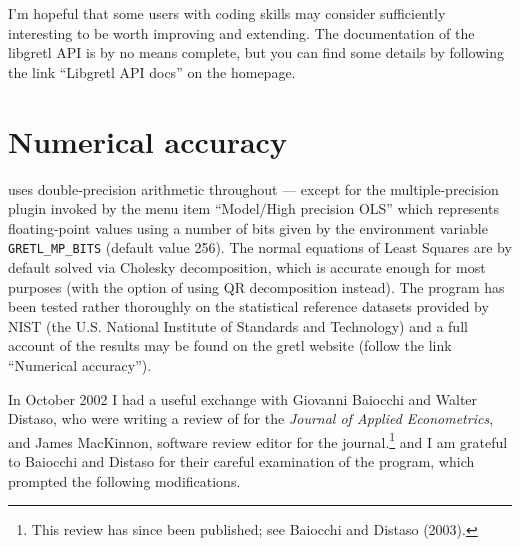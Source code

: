 I'm hopeful that some users with coding skills may consider
 sufficiently interesting to be worth improving and
extending.  The documentation of the libgretl API is by no means
complete, but you can find some details by following the link
``Libgretl API docs'' on the  homepage.

\chapter{Numerical accuracy}
\label{app-accuracy}

 uses double-precision arithmetic throughout --- except for
the multiple-precision plugin invoked by the menu item ``Model/High
precision OLS'' which represents floating-point values using a number
of bits given by the environment variable \verb+GRETL_MP_BITS+
(default value 256).  The normal equations of Least Squares are by
default solved via Cholesky decomposition, which is accurate enough
for most purposes (with the option of using QR decomposition instead).
The program has been tested rather thoroughly on the statistical
reference datasets provided by NIST (the U.S. National Institute of
Standards and Technology) and a full account of the results may be
found on the gretl website (follow the link ``Numerical accuracy'').

In October 2002 I had a useful exchange with Giovanni Baiocchi and
Walter Distaso, who were writing a review of  for the
\emph{Journal of Applied Econometrics}, and James MacKinnon, software
review editor for the journal.\footnote{This review has since been
  published; see Baiocchi and Distaso (2003).} and I am grateful to
Baiocchi and Distaso for their careful examination of the program,
which prompted the following modifications.

